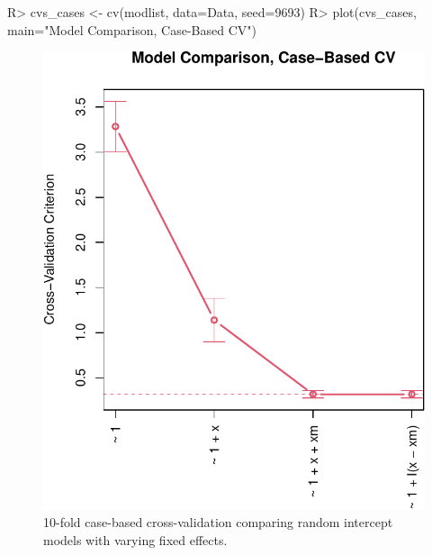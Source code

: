 \documentclass[
]{jss}
\begin{document}
\begin{CodeChunk}
\begin{CodeInput}
R> cvs_cases <- cv(modlist, data=Data, seed=9693)
R> plot(cvs_cases, main="Model Comparison, Case-Based CV")
\end{CodeInput}
\begin{figure}

{\centering \includegraphics[width=1\linewidth]{JSS-article_files/figure-latex/cross-validation-cases-1} 

}

\caption[10-fold case-based cross-validation comparing random intercept models with varying fixed effects]{10-fold case-based cross-validation comparing random intercept models with varying fixed effects.}\label{fig:cross-validation-cases}
\end{figure}
\end{CodeChunk}
\end{document}
